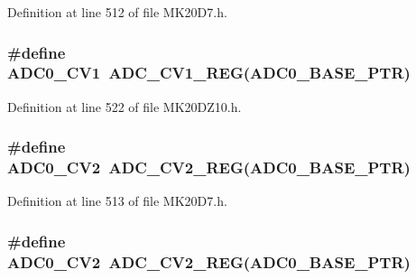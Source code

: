 Definition at line 512 of file M\+K20\+D7.\+h.

\subsubsection[{\texorpdfstring{A\+D\+C0\+\_\+\+C\+V1}{ADC0_CV1}}]{\setlength{\rightskip}{0pt plus 5cm}\#define A\+D\+C0\+\_\+\+C\+V1~{\bf A\+D\+C\+\_\+\+C\+V1\+\_\+\+R\+EG}({\bf A\+D\+C0\+\_\+\+B\+A\+S\+E\+\_\+\+P\+TR})}\hypertarget{group___a_d_c___register___accessor___macros_ga81c4f6279bc8781a0708eab12b457951}{}\label{group___a_d_c___register___accessor___macros_ga81c4f6279bc8781a0708eab12b457951}


Definition at line 522 of file M\+K20\+D\+Z10.\+h.

\subsubsection[{\texorpdfstring{A\+D\+C0\+\_\+\+C\+V2}{ADC0_CV2}}]{\setlength{\rightskip}{0pt plus 5cm}\#define A\+D\+C0\+\_\+\+C\+V2~{\bf A\+D\+C\+\_\+\+C\+V2\+\_\+\+R\+EG}({\bf A\+D\+C0\+\_\+\+B\+A\+S\+E\+\_\+\+P\+TR})}\hypertarget{group___a_d_c___register___accessor___macros_ga6625abe45d9bef5adac93e647cd034c3}{}\label{group___a_d_c___register___accessor___macros_ga6625abe45d9bef5adac93e647cd034c3}


Definition at line 513 of file M\+K20\+D7.\+h.

\subsubsection[{\texorpdfstring{A\+D\+C0\+\_\+\+C\+V2}{ADC0_CV2}}]{\setlength{\rightskip}{0pt plus 5cm}\#define A\+D\+C0\+\_\+\+C\+V2~{\bf A\+D\+C\+\_\+\+C\+V2\+\_\+\+R\+EG}({\bf A\+D\+C0\+\_\+\+B\+A\+S\+E\+\_\+\+P\+TR})}\hypertarget{group___a_d_c___register___accessor___macros_ga6625abe45d9bef5adac93e647cd034c3}{}\label{group___a_d_c___register___accessor___macros_ga6625abe45d9bef5adac93e647cd034c3}


